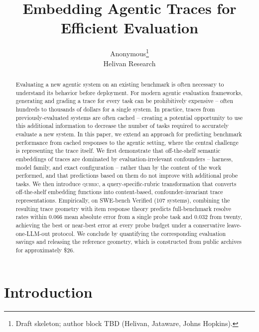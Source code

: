 \documentclass{article}
\title{Embedding Agentic Traces for Efficient Evaluation}
\author{Anonymous\thanks{Draft skeleton; author block TBD (Helivan, Jataware, Johns Hopkins).}\\
Helivan Research
}
\newcommand{\qubric}{\textsc{qubric}}
\begin{document}
\maketitle

\begin{abstract}
Evaluating a new agentic system on an existing benchmark is often necessary to understand its behavior before deployment.
For modern agentic evaluation frameworks, generating and grading a trace for every task can be prohibitively expensive -- often hundreds to thousands of dollars for a single system.
In practice, traces from previously-evaluated systems are often cached -- creating a potential opportunity to use this additional information to decrease the number of tasks required to accurately evaluate a new system.
In this paper, we extend an approach for predicting benchmark performance from cached responses to the agentic setting, where the central challenge is representing the trace itself.
We first demonstrate that off-the-shelf semantic embeddings of traces are dominated by evaluation-irrelevant confounders -- harness, model family, and exact configuration -- rather than by the content of the work performed, and that predictions based on them do not improve with additional probe tasks.
We then introduce \qubric{}, a query-specific-rubric transformation that converts off-the-shelf embedding functions into content-based, confounder-invariant trace representations.
Empirically, on SWE-bench Verified (107 systems), combining the resulting trace geometry with item response theory predicts full-benchmark resolve rates within 0.066 mean absolute error from a single probe task and 0.032 from twenty, achieving the best or near-best error at every probe budget under a conservative leave-one-LLM-out protocol.
We conclude by quantifying the corresponding evaluation savings and releasing the reference geometry, which is constructed from public archives for approximately \$26.
\end{abstract}

\section{Introduction}
\label{sec:intro}
\end{document}
